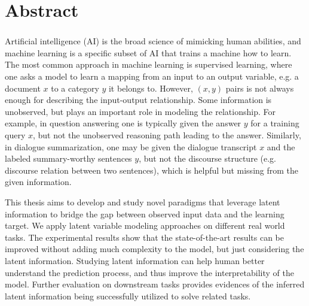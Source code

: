 \chapter*{Abstract} 
\subsection*{\thesistitle}



Artificial intelligence (AI) is the broad science of mimicking human abilities, and machine learning is a specific subset of AI that trains a machine how to learn. The most common approach in machine learning is supervised learning, where one asks a model to learn a mapping from an input to an output variable, e.g. a document $x$ to a category $y$ it belongs to. However, $(x,y)$ pairs is not always enough for describing the input-output relationship. Some information is unobserved, but plays an important role in modeling the relationship. For example, in question answering one is typically given the answer $y$ for a training query $x$, but not the unobserved reasoning path leading to the answer. Similarly, in dialogue summarization, one may be given the dialogue transcript $x$ and the labeled summary-worthy sentences $y$, but not the discourse structure (e.g. discourse relation between two sentences), which is helpful but missing from the given information.

This thesis aims to develop and study novel paradigms that leverage latent information to bridge the gap between observed input data and the learning target. We apply latent variable modeling approaches on different real world tasks. The experimental results show that the state-of-the-art results can be improved without adding much complexity to the model, but just considering the latent information. Studying latent information can help human better understand the prediction process, and thus improve the interpretability of the model. Further evaluation on downstream tasks provides evidences of the inferred latent information being successfully utilized to solve related tasks.

